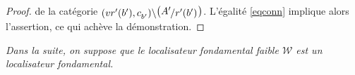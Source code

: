 \documentclass[francais]{smfart}
\theoremstyle{plain}
\theoremstyle{remark}
\theoremstyle{definition}
\numberwithin{equation}{thm}
\begin{document}
\begin{proof}
de la catégorie ${\mathchoice {\raise -1.8pt\vbox{\hbox{${(vr'(b'),c^{}_{b'})}\backslash$}}{\bigl({\mathchoice {{A'}\raise -1.8pt\vbox{\hbox{$\kern -.8pt/{r'(b')}$}}} {{A'}\raise -1.8pt\vbox{\hbox{$\kern -.8pt/{r'(b')}$}}\kern .8pt} {{A'}\raise -1.8pt\vbox{\hbox{$\scriptstyle\kern -.8pt /{r'(b')}$}}} {{A'}\raise -1.8pt\vbox{\hbox{$\scriptscriptstyle\kern -.8pt /{r'(b')}$}}} }\bigr)}} {\raise -1.8pt\vbox{\hbox{${(vr'(b'),c^{}_{b'})}\backslash$}}{\bigl({\mathchoice {{A'}\raise -1.8pt\vbox{\hbox{$\kern -.8pt/{r'(b')}$}}} {{A'}\raise -1.8pt\vbox{\hbox{$\kern -.8pt/{r'(b')}$}}\kern .8pt} {{A'}\raise -1.8pt\vbox{\hbox{$\scriptstyle\kern -.8pt /{r'(b')}$}}} {{A'}\raise -1.8pt\vbox{\hbox{$\scriptscriptstyle\kern -.8pt /{r'(b')}$}}} }\bigr)}} {\raise -1.8pt\vbox{\hbox{$\scriptstyle{(vr'(b'),c^{}_{b'})}\backslash$}}{\bigl({\mathchoice {{A'}\raise -1.8pt\vbox{\hbox{$\kern -.8pt/{r'(b')}$}}} {{A'}\raise -1.8pt\vbox{\hbox{$\kern -.8pt/{r'(b')}$}}\kern .8pt} {{A'}\raise -1.8pt\vbox{\hbox{$\scriptstyle\kern -.8pt /{r'(b')}$}}} {{A'}\raise -1.8pt\vbox{\hbox{$\scriptscriptstyle\kern -.8pt /{r'(b')}$}}} }\bigr)}} {\raise -1.8pt\vbox{\hbox{$\scriptscriptstyle{(vr'(b'),c^{}_{b'})}\backslash$}}{\bigl({\mathchoice {{A'}\raise -1.8pt\vbox{\hbox{$\kern -.8pt/{r'(b')}$}}} {{A'}\raise -1.8pt\vbox{\hbox{$\kern -.8pt/{r'(b')}$}}\kern .8pt} {{A'}\raise -1.8pt\vbox{\hbox{$\scriptstyle\kern -.8pt /{r'(b')}$}}} {{A'}\raise -1.8pt\vbox{\hbox{$\scriptscriptstyle\kern -.8pt /{r'(b')}$}}} }\bigr)}} }$.
L'égalité \ref{eqconn} implique alors l'assertion, ce qui achève la démonstration.
\end{proof}

\noindent
\emph{Dans la suite, on suppose que le localisateur fondamental faible ${\mathcal{W}}$ est un localisateur fondamental.}
\end{document}
